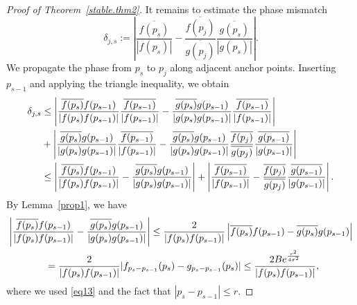 \documentclass[11pt, reqno]{amsart}
\numberwithin{equation}{section}
\begin{document}
\begin{proof}[Proof of Theorem~\ref{stable.thm2}]
It remains to estimate the phase mismatch
$$\delta_{j,s} := \left| \frac{\overline{f(p_s)}}{|f(p_s)|} - \frac{\overline{f(p_j)}}{\overline{g(p_j)}} \frac{\overline{g(p_s)}}{|g(p_s)|} \right|.$$
We propagate the phase from $p_s$ to $p_j$ along adjacent anchor points. Inserting
$p_{s-1}$ and applying the triangle inequality, we obtain
\begin{align}\label{phase.pro.proof.eq1}
    \delta_{j,s} &\le
     \left|  \frac{\overline{f(p_s)} f(p_{s-1}) }{|f(p_s) f(p_{s-1})|} \frac{\overline{f(p_{s-1})}}{|f(p_{s-1})|} - \frac{\overline{g(p_s)} g(p_{s-1}) }{|g(p_s) g(p_{s-1})|}  \frac{\overline{f(p_{s-1})}}{|f(p_{s-1})|}  \right|  \notag \\
     &+   \left|  \frac{\overline{g(p_s)} g(p_{s-1}) }{|g(p_s) g(p_{s-1})|} \frac{\overline{f(p_{s-1})}}{|f(p_{s-1})|}   -   \frac{\overline{g(p_s)} g(p_{s-1}) }{|g(p_s) g(p_{s-1})|} \frac{\overline{f(p_j)}}{\overline{g(p_j)}} \frac{\overline{g(p_{s-1})}}{|g(p_{s-1})|} \right| \notag\\
     &\le \left| \frac{\overline{f(p_s)}f(p_{s-1})}{|f(p_s)f(p_{s-1})|}
- \frac{\overline{g(p_s)}g(p_{s-1})}{|g(p_s)g(p_{s-1})|} \right|
+ \left| \frac{\overline{f(p_{s-1})}}{|f(p_{s-1})|}
- \frac{\overline{f(p_j)}}{\overline{g(p_j)}}\frac{\overline{g(p_{s-1})}}{|g(p_{s-1})|}\right|.
\end{align}
By Lemma~\ref{prop1}, we have 
\begin{align}\label{phase.pro.proof.eq2}
\left| \frac{\overline{f(p_s)}f(p_{s-1})}{|f(p_s)f(p_{s-1})|} - \frac{\overline{g(p_s)}g(p_{s-1})}{|g(p_s)g(p_{s-1})|}\right|
&\le\frac{2}{|f(p_s)f(p_{s-1})|}\left|\overline{f(p_s)}f(p_{s-1}) - \overline{g(p_s)}g(p_{s-1}) \right| \notag \\
\hskip-1.5in&\hskip-1.5in= \frac{2}{|f(p_s)f(p_{s-1})|} |f_{p_s-p_{s-1}}(p_s)-g_{p_s-p_{s-1}}(p_s)| \le \frac{2Be^{\frac{r^2}{4\sigma^2}}}{|f(p_s)f(p_{s-1})|},
\end{align}
where we used \eqref{eq13} and the fact that $|p_s-p_{s-1}|\le r$. 


\end{proof}
\end{document}
